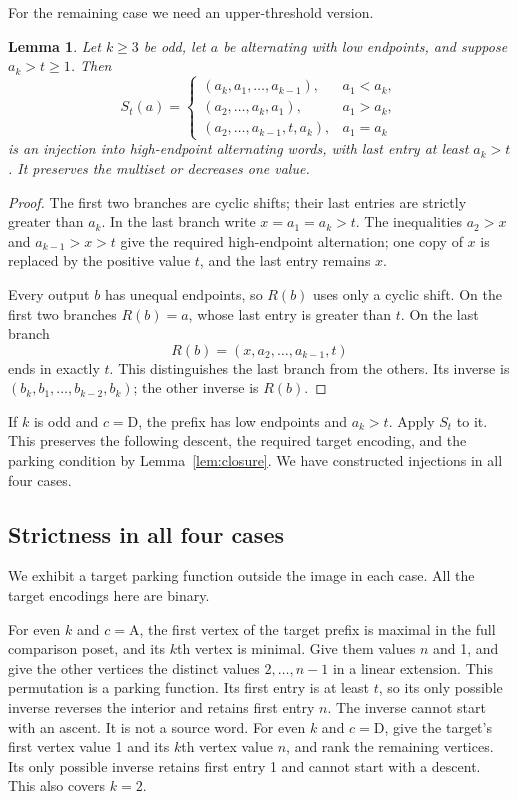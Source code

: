 \documentclass[11pt]{article}
\newtheorem{lemma}[theorem]{Lemma}
\theoremstyle{definition}
\newcommand{\A}{\mathrm A}
\newcommand{\D}{\mathrm D}
\begin{document}
For the remaining case we need an upper-threshold version.

\begin{lemma}\label{lem:S}
Let $k\ge3$ be odd, let $a$ be alternating with low endpoints,
and suppose $a_k>t\ge1$. Then
\[
S_t(a)=
\begin{cases}
(a_k,a_1,\ldots,a_{k-1}),&a_1<a_k,\\
(a_2,\ldots,a_k,a_1),&a_1>a_k,\\
(a_2,\ldots,a_{k-1},t,a_k),&a_1=a_k
\end{cases}
\]
is an injection into high-endpoint alternating words, with last
entry at least $a_k>t$. It preserves the multiset or decreases
one value.
\end{lemma}
\begin{proof}
The first two branches are cyclic shifts; their last entries are
strictly greater than $a_k$. In the last branch write
$x=a_1=a_k>t$. The inequalities $a_2>x$ and $a_{k-1}>x>t$
give the required high-endpoint alternation; one copy of $x$
is replaced by the positive value $t$, and the last entry remains $x$.

Every output $b$ has unequal endpoints, so $R(b)$ uses only a
cyclic shift. On the first two branches $R(b)=a$, whose last entry
is greater than $t$. On the last branch
\[
R(b)=(x,a_2,\ldots,a_{k-1},t)
\]
ends in exactly $t$. This distinguishes the last branch from the
others. Its inverse is
$(b_k,b_1,\ldots,b_{k-2},b_k)$; the other inverse is $R(b)$.
\end{proof}

If $k$ is odd and $c=\D$, the prefix has low endpoints and
$a_k>t$. Apply $S_t$ to it. This preserves the following descent,
the required target encoding, and the parking condition by
Lemma~\ref{lem:closure}. We have constructed injections in all four
cases.

\subsection{Strictness in all four cases}
We exhibit a target parking function outside the image in each case.
All the target encodings here are binary.

For even $k$ and $c=\A$, the first vertex of the target prefix is
maximal in the full comparison poset, and its $k$th vertex is minimal.
Give them values $n$ and 1, and give the other vertices the distinct
values $2,\ldots,n-1$ in a linear extension. This permutation is a
parking function. Its first entry is at least $t$, so its only possible
inverse reverses the interior and retains first entry $n$. The
inverse cannot start with an ascent. It is not a source word.
For even $k$ and $c=\D$, give the target's first vertex value 1 and
its $k$th vertex value $n$, and rank the remaining vertices.
Its only possible inverse retains first entry 1 and cannot start
with a descent. This also covers $k=2$.
\end{document}
